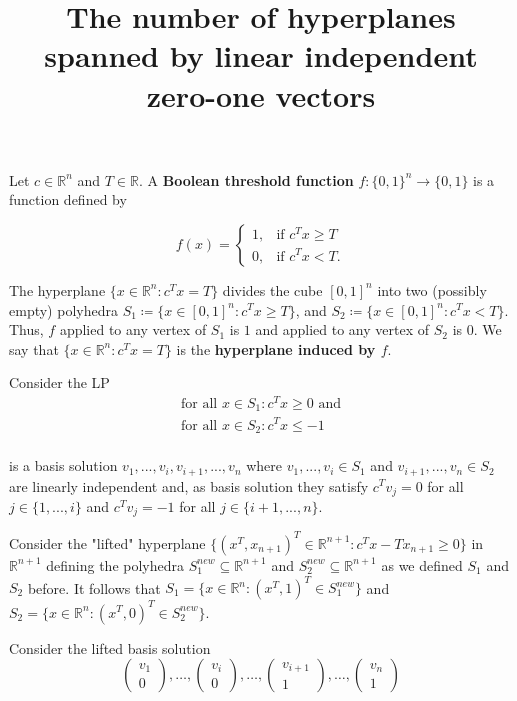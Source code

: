 \documentclass[11pt]{amsart}
\title{The number of hyperplanes spanned by linear independent zero-one vectors}
\theoremstyle{definition}
\theoremstyle{definition}
\theoremstyle{question}
\newcommand\Def[1]{{\bf #1}}
\begin{document}
\maketitle

Let $c \in \mathbb{R}^n$ and $T \in \mathbb{R}$. 
A \Def{Boolean threshold function} $f \colon \{0,1 \}^n \rightarrow \{0,1 \}$ is a function defined by

\begin{equation*}
  f(x)=\begin{cases}
    1, & \text{if $c^Tx \geq T$}\\
    0, & \text{if $c^Tx < T$}.
  \end{cases}
\end{equation*}

The hyperplane $\{ x \in \mathbb{R}^n : c^Tx = T \} $ divides the cube $[0,1]^n$ into two (possibly empty) polyhedra $S_1 \coloneqq \{ x \in [0,1]^n : c^Tx \geq T \}$, and $S_2 \coloneqq \{ x \in [0,1]^n : c^Tx < T \} $. 
Thus, $f$ applied to any vertex of $S_1$ is $1$ and applied to any vertex of $S_2$ is $0$. 
We say that $\{ x \in \mathbb{R}^n : c^Tx = T \} $ is the \Def{hyperplane induced by $f$}.

Consider the LP 
\begin{align*}
    \text{for all  } x \in S_1: c^Tx \geq 0 \text{ and} \\
    \text{for all  } x \in S_2: c^Tx \leq -1 \\
\end{align*}

is a basis solution $v_1,...,v_i,v_{i+1},...,v_n$ where $v_1,...,v_i \in S_1 $ and $v_{i+1},..., v_n \in S_2$ are linearly independent and, as basis solution they satisfy $c^Tv_j = 0$ for all $j \in \{1,...,i\}$ and $c^Tv_j = -1$ for all $j \in \{i+1,...,n\}$.

Consider the "lifted" hyperplane $\{ (x^T, x_{n+1})^T \in \mathbb{R}^{n+1} : c^Tx - Tx_{n+1} \geq 0 \} $ in $\mathbb{R}^{n+1}$ defining the polyhedra $S_1^{new} \subseteq \mathbb{R}^{n+1}$ and $S_2^{new} \subseteq \mathbb{R}^{n+1}$ as we defined $S_1$ and $S_2$ before. It follows that $S_1 = \{ x \in \mathbb{R}^n : (x^T,1)^T \in S_1^{new} \}  $ and $S_2 = \{ x \in \mathbb{R}^n : (x^T,0)^T \in S_2^{new} \}  $. 

Consider the lifted basis solution 
\[ \left( \begin{array}{cc}
v_1\\
0 
\end{array} \right),\dots,
%
\left( \begin{array}{cc}
v_i\\
0 
\end{array} \right),\dots,
\left( \begin{array}{cc}
v_{i+1}\\
1
\end{array} \right),\dots,
\left( \begin{array}{cc}
v_n\\
1
\end{array} \right)
\]
\end{document}
